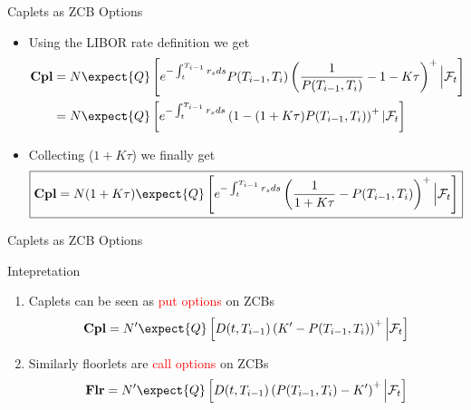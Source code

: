 \documentclass{beamer}
\begin{document}
\begin{frame}{Caplets as ZCB Options}
	\begin{itemize}
		\item<1-> Using the LIBOR rate definition we get
		\begin{equation*}
			\begin{aligned}
				\textbf{Cpl} &=N\expect{Q}\left[e^{-\int_t^{T_{i-1}}r_s ds}P(T_{i-1},T_i)\left(\frac{1}{P(T_{i-1},T_i)}-1-K\tau\right)^+ \Big\rvert \mathcal{F}_t\right] \\
				& = N\expect{Q}\left[e^{-\int_t^{T_{i-1}}r_s ds}\left(1-(1+K\tau)P(T_{i-1},T_i)\right)^+ | \mathcal{F}_t\right]
			\end{aligned}
		\end{equation*}
		\item<2-> Collecting ($1+K\tau$) we finally get
		\begin{equation}
			\boxed{\textbf{Cpl}=N(1+K\tau)\expect{Q}\left[e^{-\int_t^{T_{i-1}}r_s ds}\left(\frac{1}{1+K\tau}-P(T_{i-1},T_i)\right)^+ \Big\rvert \mathcal{F}_t\right]}
		\end{equation}
	\end{itemize}
\end{frame}

\begin{frame}{Caplets as ZCB Options}
	\begin{block}{Intepretation}
		\begin{enumerate}
		\item Caplets can be seen as \textcolor{red}{put options} on ZCBs
\begin{equation*}
\textbf{Cpl}=N'\expect{Q}\left[D(t,T_{i-1})\left(K'-P(T_{i-1},T_i)\right)^+ \Big\rvert \mathcal{F}_t\right]
\end{equation*}
		\item Similarly floorlets are \textcolor{red}{call options} on ZCBs
\begin{equation}
\textbf{Flr}=N'\expect{Q}\left[D(t, T_{i-1})\left(P(T_{i-1},T_i)-K'\right)^+ \Big\rvert \mathcal{F}_t\right]
\end{equation}
		\end{enumerate}
	\end{block}
\end{frame}
\end{document}
